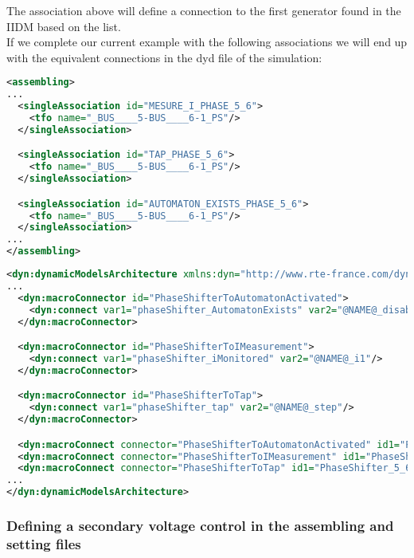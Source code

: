 \documentclass[a4paper, 12pt]{report}
\begin{document}
The association above will define a connection to the first generator found in the IIDM based on the list. \\

If we complete our current example with the following associations we will end up with the equivalent connections in the dyd file of the \Dynawo simulation:
 \begin{lstlisting}[language=XML, breaklines=true, breakatwhitespace=false, columns=fullflexible]
<assembling>
...
  <singleAssociation id="MESURE_I_PHASE_5_6">
    <tfo name="_BUS____5-BUS____6-1_PS"/>
  </singleAssociation>

  <singleAssociation id="TAP_PHASE_5_6">
    <tfo name="_BUS____5-BUS____6-1_PS"/>
  </singleAssociation>

  <singleAssociation id="AUTOMATON_EXISTS_PHASE_5_6">
    <tfo name="_BUS____5-BUS____6-1_PS"/>
  </singleAssociation>
...
</assembling>
\end{lstlisting}

\begin{lstlisting}[language=XML, breaklines=true, breakatwhitespace=false, columns=fullflexible]
<dyn:dynamicModelsArchitecture xmlns:dyn="http://www.rte-france.com/dynawo">
...
  <dyn:macroConnector id="PhaseShifterToAutomatonActivated">
    <dyn:connect var1="phaseShifter_AutomatonExists" var2="@NAME@_disable_internal_tapChanger"/>
  </dyn:macroConnector>

  <dyn:macroConnector id="PhaseShifterToIMeasurement">
    <dyn:connect var1="phaseShifter_iMonitored" var2="@NAME@_i1"/>
  </dyn:macroConnector>

  <dyn:macroConnector id="PhaseShifterToTap">
    <dyn:connect var1="phaseShifter_tap" var2="@NAME@_step"/>
  </dyn:macroConnector>

  <dyn:macroConnect connector="PhaseShifterToAutomatonActivated" id1="PhaseShifter_5_6" id2="NETWORK" index1="0" name2="_BUS____5-BUS____6-1_PS"/>
  <dyn:macroConnect connector="PhaseShifterToIMeasurement" id1="PhaseShifter_5_6" id2="NETWORK" index1="0" name2="_BUS____5-BUS____6-1_PS"/>
  <dyn:macroConnect connector="PhaseShifterToTap" id1="PhaseShifter_5_6" id2="NETWORK" index1="0" name2="_BUS____5-BUS____6-1_PS"/>
...
</dyn:dynamicModelsArchitecture>
\end{lstlisting}


\subsubsection{Defining a secondary voltage control in the assembling and setting files}
\end{document}

